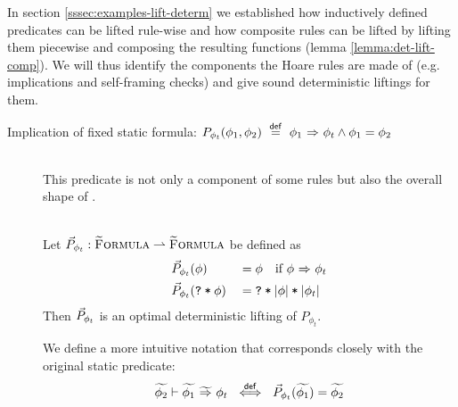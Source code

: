 In section \ref{sssec:examples-lift-determ} we established how inductively defined predicates can be lifted rule-wise and how composite rules can be lifted by lifting them piecewise and composing the resulting functions (lemma \ref{lemma:det-lift-comp}).
We will thus identify the components the Hoare rules are made of (e.g. implications and self-framing checks) and give sound deterministic liftings for them.

\begin{description}
    \item[Implication of fixed static formula: $P_{\phi_t}(\phi_1, \phi_2) ~\defeq~ \phiImplies{\phi_1}{\phi_t} \wedge \phi_1 = \phi_2$]~\\
    This predicate is not only a component of some rules but also the overall shape of .
    \begin{lemma}~\\
        Let $\dgrad{P}_{\phi_t} : \setGFormula \rightharpoonup \setGFormula$ be defined as
        \begin{alignat*}{2}
        	 & \dgrad{P}_{\phi_t}(\phi)          & &= \phi  \quad\text{if } \phiImplies{\phi}{\phi_t} \\
        	 & \dgrad{P}_{\phi_t}(\withqm{\phi}) & &= \withqm{\phiCons{\norms{\phi}}{\norms{\phi_t}}}
        \end{alignat*}
        Then $\dgrad{P}_{\phi_t}$ is an optimal deterministic lifting of $P_{\phi_t}$.
    \end{lemma}
    We define a more intuitive notation that corresponds closely with the original static predicate:
    \begin{displaymath}
    \gphiImpliesEv{\grad{\phi_1}}{\phi_t}{\grad{\phi_2}} ~\defiff~ \dgrad{P}_{\phi_t}(\grad{\phi_1}) = \grad{\phi_2}
    \end{displaymath}
    

\end{description}
